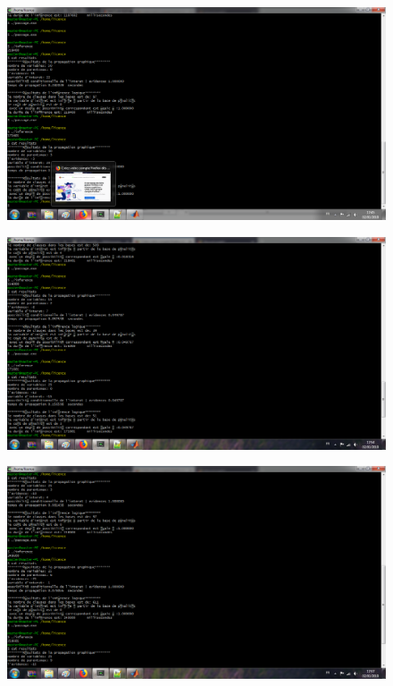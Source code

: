 \documentclass[12pt,a4paper,oneside]{book}
\begin{document}
\begin{figure}[H]
	\centering
	\includegraphics[scale=0.4]{screens/polytree.png}%
	\label{labelname}%
\end{figure}

\begin{figure}[H]
	\centering
	\includegraphics[scale=0.4]{screens/25_0.png}%
	\label{labelname}%
\end{figure}

\begin{figure}[H]
	\centering
	\includegraphics[scale=0.4]{screens/25_3_6.png}%
	\label{labelname}%
\end{figure}
\end{document}
